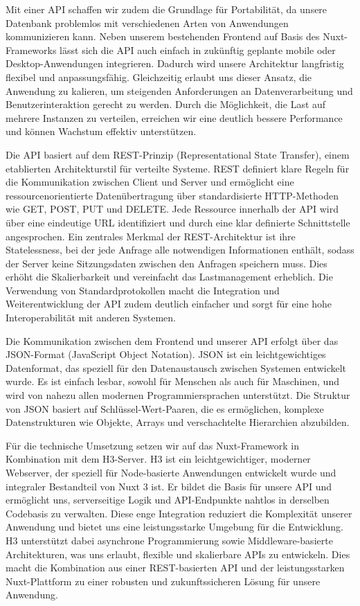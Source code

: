 \documentclass[a4paper,12pt]{article}
\begin{document}
Mit einer API schaffen wir zudem die Grundlage für Portabilität, da unsere
Datenbank problemlos mit verschiedenen Arten von Anwendungen kommunizieren
kann. Neben unserem bestehenden Frontend auf Basis des Nuxt-Frameworks lässt
sich die API auch einfach in zukünftig geplante mobile oder Desktop-Anwendungen
integrieren. Dadurch wird unsere Architektur langfristig flexibel und
anpassungsfähig. Gleichzeitig erlaubt uns dieser Ansatz, die Anwendung zu
kalieren, um steigenden Anforderungen an Datenverarbeitung und
Benutzerinteraktion gerecht zu werden. Durch die Möglichkeit, die Last auf
mehrere Instanzen zu verteilen, erreichen wir eine deutlich bessere Performance
und können Wachstum effektiv unterstützen.

Die API basiert auf dem REST-Prinzip (Representational State Transfer), einem
etablierten Architekturstil für verteilte Systeme. REST definiert klare Regeln
für die Kommunikation zwischen Client und Server und ermöglicht eine
ressourcenorientierte Datenübertragung über standardisierte HTTP-Methoden wie
GET, POST, PUT und DELETE. Jede Ressource innerhalb der API wird über eine
eindeutige URL identifiziert und durch eine klar definierte Schnittstelle
angesprochen. Ein zentrales Merkmal der REST-Architektur ist ihre
Statelessness, bei der jede Anfrage alle notwendigen Informationen enthält,
sodass der Server keine Sitzungsdaten zwischen den Anfragen speichern muss.
Dies erhöht die Skalierbarkeit und vereinfacht das Lastmanagement erheblich.
Die Verwendung von Standardprotokollen macht die Integration und
Weiterentwicklung der API zudem deutlich einfacher und sorgt für eine hohe
Interoperabilität mit anderen Systemen.

Die Kommunikation zwischen dem Frontend und unserer API erfolgt über das
JSON-Format (JavaScript Object Notation). JSON ist ein leichtgewichtiges
Datenformat, das speziell für den Datenaustausch zwischen Systemen entwickelt
wurde. Es ist einfach lesbar, sowohl für Menschen als auch für Maschinen, und
wird von nahezu allen modernen Programmiersprachen unterstützt. Die Struktur
von JSON basiert auf Schlüssel-Wert-Paaren, die es ermöglichen, komplexe
Datenstrukturen wie Objekte, Arrays und verschachtelte Hierarchien abzubilden.

Für die technische Umsetzung setzen wir auf das Nuxt-Framework in Kombination
mit dem H3-Server. H3 ist ein leichtgewichtiger, moderner Webserver, der
speziell für Node-basierte Anwendungen entwickelt wurde und integraler
Bestandteil von Nuxt 3 ist. Er bildet die Basis für unsere API und ermöglicht
uns, serverseitige Logik und API-Endpunkte nahtlos in derselben Codebasis zu
verwalten. Diese enge Integration reduziert die Komplexität unserer Anwendung
und bietet uns eine leistungsstarke Umgebung für die Entwicklung. H3
unterstützt dabei asynchrone Programmierung sowie Middleware-basierte
Architekturen, was uns erlaubt, flexible und skalierbare APIs zu entwickeln.
Dies macht die Kombination aus einer REST-basierten API und der
leistungsstarken Nuxt-Plattform zu einer robusten und zukunftssicheren Lösung
für unsere Anwendung.
\end{document}
